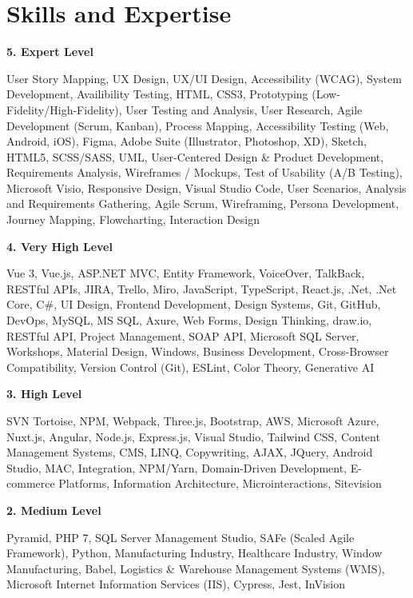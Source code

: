 \documentclass[a4paper,10pt]{article}
\begin{document}
\section*{Skills and Expertise}

\textbf{5. Expert Level}

User Story Mapping, UX Design, UX/UI Design, Accessibility (WCAG), System Development, Availibility Testing, HTML, CSS3, Prototyping (Low-Fidelity/High-Fidelity), User Testing and Analysis, User Research, Agile Development (Scrum, Kanban), Process Mapping, Accessibility Testing (Web, Android, iOS), Figma, Adobe Suite (Illustrator, Photoshop, XD), Sketch, HTML5, SCSS/SASS, UML, User-Centered Design \& Product Development, Requirements Analysis, Wireframes / Mockups, Test of Usability (A/B Testing), Microsoft Visio, Responsive Design, Visual Studio Code, User Scenarios, Analysis and Requirements Gathering, Agile Scrum, Wireframing, Persona Development, Journey Mapping, Flowcharting, Interaction Design
\vspace{0.3cm}

\textbf{4. Very High Level}

Vue 3, Vue.js, ASP.NET MVC, Entity Framework, VoiceOver, TalkBack, RESTful APIs, JIRA, Trello, Miro, JavaScript, TypeScript, React.js, .Net, .Net Core, C\#, UI Design, Frontend Development, Design Systems, Git, GitHub, DevOps, MySQL, MS SQL, Axure, Web Forms, Design Thinking, draw.io, RESTful API, Project Management, SOAP API, Microsoft SQL Server, Workshops, Material Design, Windows, Business Development, Cross-Browser Compatibility, Version Control (Git), ESLint, Color Theory, Generative AI
\vspace{0.5cm}

\textbf{3. High Level}

SVN Tortoise, NPM, Webpack, Three.js, Bootstrap, AWS, Microsoft Azure, Nuxt.js, Angular, Node.js, Express.js, Visual Studio, Tailwind CSS, Content Management Systems, CMS, LINQ, Copywriting, AJAX, JQuery, Android Studio, MAC, Integration, NPM/Yarn, Domain-Driven Development, E-commerce Platforms, Information Architecture, Microinteractions, Sitevision
\vspace{0.5cm}

\textbf{2. Medium Level}

Pyramid, PHP 7, SQL Server Management Studio, SAFe (Scaled Agile Framework), Python, Manufacturing Industry, Healthcare Industry, Window Manufacturing, Babel, Logistics \& Warehouse Management Systems (WMS), Microsoft Internet Information Services (IIS), Cypress, Jest, InVision
\vspace{0.5cm}
\end{document}
